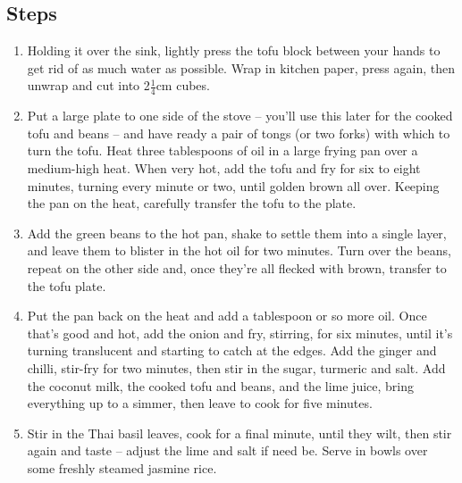 \documentclass{book}
\begin{document}
\subsection*{Steps}
\begin{enumerate}
\item Holding it over the sink, lightly press the tofu block between your hands to get rid of as much water as possible. Wrap in kitchen paper, press again, then unwrap and cut into 2$\frac{1}{4}$cm cubes.
\item Put a large plate to one side of the stove – you’ll use this later for the cooked tofu and beans – and have ready a pair of tongs (or two forks) with which to turn the tofu. Heat three tablespoons of oil in a large frying pan over a medium-high heat. When very hot, add the tofu and fry for six to eight minutes, turning every minute or two, until golden brown all over. Keeping the pan on the heat, carefully transfer the tofu to the plate.
\item Add the green beans to the hot pan, shake to settle them into a single layer, and leave them to blister in the hot oil for two minutes. Turn over the beans, repeat on the other side and, once they’re all flecked with brown, transfer to the tofu plate.
\item Put the pan back on the heat and add a tablespoon or so more oil. Once that’s good and hot, add the onion and fry, stirring, for six minutes, until it’s turning translucent and starting to catch at the edges. Add the ginger and chilli, stir-fry for two minutes, then stir in the sugar, turmeric and salt. Add the coconut milk, the cooked tofu and beans, and the lime juice, bring everything up to a simmer, then leave to cook for five minutes.
\item Stir in the Thai basil leaves, cook for a final minute, until they wilt, then stir again and taste – adjust the lime and salt if need be. Serve in bowls over some freshly steamed jasmine rice.
\end{enumerate}
\newpage
\end{document}
